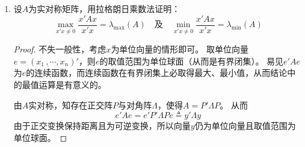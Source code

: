 \documentclass[10pt]{article}
\theoremstyle{definition}
\theoremstyle{definition}
\begin{document}
\begin{enumerate}
\begin{proof}
\begin{enumerate}[label=(\roman*), start=3]
                    根据数学归纳法，结论成立。
                \item
                    注意到
                    $PP'=\mathrm{I}$，从而$A^s=(P\Lambda P')^s=P\Lambda P'P\Lambda P'\cdots P\Lambda P'=P\Lambda^sP'$。
                    又因为相似矩阵有相同的迹，故$\mathrm{tr}(A^s)=\mathrm{tr}(\Lambda^s)=\sum_{i=1}^{n}\lambda_i^s$。
                \item
                    矩阵$A$非奇异$\Leftrightarrow$矩阵$\Lambda$非奇异$\Leftrightarrow$$\lambda_i \ne 0\ (\forall i)$。

                    又$A^{-1}=(P\Lambda P')^{-1}=P\Lambda^{-1} P'$及相似矩阵有相同的特征值，得矩阵$A^{-1}$的特征值为$\lambda_i^{-1}\text{，}i=1\, ,2\, ,\cdots ,n$。
                \item
                    注意到$\mathrm{I}_n+cA=PP'+P(c\Lambda)P'=P(\mathrm{I}_n+c\Lambda)P'$，与(vi)类似即可得证。
                \item
                    任取非零向量$x$，记向量$y=Px$，则由$P$满秩知$y$亦为非零向量。
                    从而
                    \begin{equation*}
                        x'\Lambda x=x'P'APx=y'Ay \ge 0
                    \end{equation*}
                    将$x$取遍标准单位向量即可证得结论。
            \end{enumerate}
        \end{proof}

    \item 	%
        设$A$为实对称矩阵，用拉格朗日乘数法证明：
        \begin{equation*}
            \max_{x'x \ne 0} \frac{x'Ax}{x'x} = \lambda_{\max}(A)\quad \text{及} \quad \min_{x'x \ne 0} \frac{x'Ax}{x'x} = \lambda_{\min}(A)
        \end{equation*}

        \begin{proof}
            不失一般性，考虑$x$为单位向量的情形即可。
            取单位向量$e=(x_1\, ,\cdots ,x_n)'$，则$e$的取值范围为单位球面（从而是有界闭集）。
            易见$e'Ae$为$e$的连续函数，而连续函数在有界闭集上必取得最大、最小值，从而结论中的最值运算是有意义的。

            由$A$实对称，知存在正交阵$P$与对角阵$\Lambda$，使得$A=P'\Lambda P$。
            从而
            \begin{equation*}
                e'Ae=e'P'\Lambda Pe \triangleq y'\Lambda y
            \end{equation*}
            由于正交变换保持距离且为可逆变换，所以向量$y$仍为单位向量且取值范围为单位球面。


\end{proof}
\end{enumerate}
\end{document}
